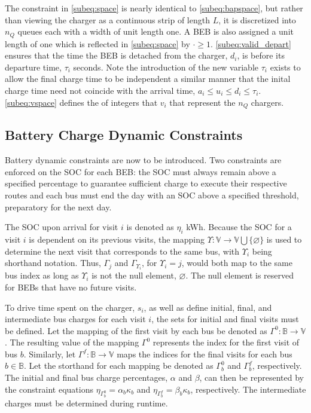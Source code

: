 \documentclass[ee,thesis]{usuthesis}
\begin{document}
The constraint in \autoref{subeq:space} is nearly identical to \autoref{subeq:bapspace}, but rather than viewing the
charger as a continuous strip of length \(L\), it is discretized into \(n_Q\) queues each with a width of unit length one. A
BEB is also assigned a unit length of one which is reflected in \autoref{subeq:space} by \(\cdot \geq 1\).
\autoref{subeq:valid_depart} ensures that the time the BEB is detached from the charger, \(d_i\), is before its departure
time, \(\tau_i\) seconds. Note the introduction of the new variable \(\tau_i\) exists to allow the final charge time to be
independent a similar manner that the inital charge time need not coincide with the arrival time, \(a_i \le u_i \le d_i \le
\tau_i\). \autoref{subeq:vspace} defines the of integers that \(v_i\) that represent the \(n_Q\) chargers.

\subsection{Battery Charge Dynamic Constraints}
\label{sec:batt_dynamics}
Battery dynamic constraints are now to be introduced. Two constraints are enforced on the SOC for each BEB: the SOC must
always remain above a specified percentage to guarantee sufficient charge to execute their respective routes and each
bus must end the day with an SOC above a specified threshold, preparatory for the next day.

The SOC upon arrival for visit \(i\) is denoted as \(\eta_i\) kWh. Because the SOC for a visit \(i\) is dependent on its previous
visits, the mapping \(\Upsilon: \mathbb{V} \rightarrow \mathbb{V} \bigcup \{\varnothing\}\) is used to determine the next visit that corresponds
to the same bus, with \(\Upsilon_i\) being shorthand notation. Thus, \(\Gamma_j\) and \(\Gamma_{\Upsilon_i}\), for \(\Upsilon_i = j\), would both map to the
same bus index as long as \(\Upsilon_i\) is not the null element, \(\varnothing\). The null element is reserved for BEBs that have
no future visits.

To drive time spent on the charger, $s_i$, as well as define initial, final, and intermediate bus charges for each visit
$i$, the sets for initial and final visits must be defined. Let the mapping of the first visit by each bus be denoted as
$\Gamma^0 : \mathbb{B} \rightarrow \mathbb{V}$. The resulting value of the mapping $\Gamma^0$ represents the index for
the first visit of bus $b$. Similarly, let $\Gamma^f : \mathbb{B} \rightarrow \mathbb{V}$ maps the indices for the final
visits for each bus $b \in \mathbb{B}$. Let the storthand for each mapping be denoted as $\Gamma^0_b$ and $\Gamma^f_b$,
respectively. The initial and final bus charge percentages, $\alpha$ and $\beta$, can then be represented by the
constraint equations $\eta_{\Gamma^0_b} = \alpha_b \kappa_{b}$ and $\eta_{\Gamma^f_b} = \beta_b \kappa_{b}$,
respectively. The intermediate charges must be determined during runtime.
\end{document}
